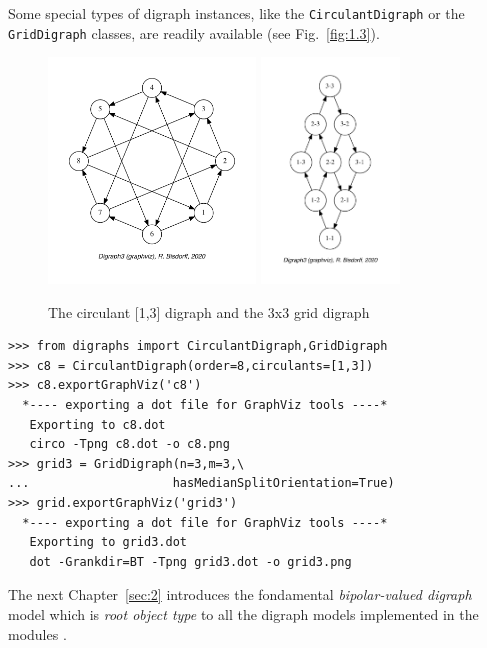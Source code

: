 Some special types of digraph instances, like the \texttt{CirculantDigraph} or the \texttt{GridDigraph} classes, are readily available (see Fig.~\vref{fig:1.3}).
 \begin{figure}[ht]
  \includegraphics[height=6cm]{Figures/1-3-c8.pdf} \hfill
  \includegraphics[height=6cm]{Figures/1-3-grid3.pdf} \hfill
  \caption{The circulant [1,3] digraph and the 3x3 grid digraph}
\label{fig:1.3}       %
\end{figure}
\begin{lstlisting}[caption={Circulant digraphs and $n \times m$ grid digraphs},label=list:1.7]
>>> from digraphs import CirculantDigraph,GridDigraph
>>> c8 = CirculantDigraph(order=8,circulants=[1,3])
>>> c8.exportGraphViz('c8')
  *---- exporting a dot file for GraphViz tools ----*
   Exporting to c8.dot
   circo -Tpng c8.dot -o c8.png
>>> grid3 = GridDigraph(n=3,m=3,\
...                    hasMedianSplitOrientation=True)
>>> grid.exportGraphViz('grid3')
  *---- exporting a dot file for GraphViz tools ----*
   Exporting to grid3.dot
   dot -Grankdir=BT -Tpng grid3.dot -o grid3.png
 \end{lstlisting}

\vspace{\baselineskip}
The next Chapter~\ref{sec:2} introduces the fondamental \emph{bipolar-valued digraph} model which is \emph{root object type} to all the digraph models implemented in the \Digraph modules \citep{BIS-2021b}.    


%
%
